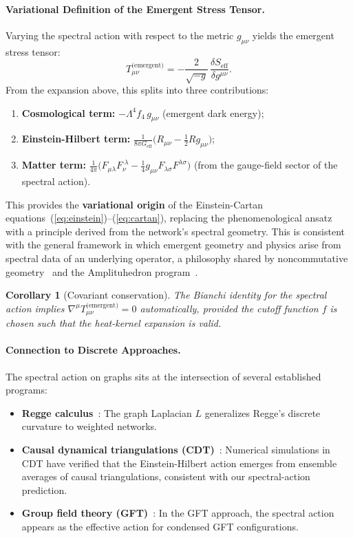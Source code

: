 \documentclass[11pt,a4paper]{article}
\newtheorem{corollary}[theorem]{Corollary}
\theoremstyle{definition}
\theoremstyle{remark}
\newcommand{\Tem}{T^{\text{(emergent)}}}
\newcommand{\Geff}{G_{\text{eff}}}
\newcommand{\Seff}{S_{\text{eff}}}
\begin{document}
\paragraph{Variational Definition of the Emergent Stress Tensor.} Varying the
spectral action with respect to the metric $g_{\mu\nu}$ yields the emergent
stress tensor:
\begin{equation}
\Tem_{\mu\nu} = -\frac{2}{\sqrt{-g}} \,
\frac{\delta \Seff}{\delta g^{\mu\nu}}.
\end{equation}
From the expansion above, this splits into three contributions:
\begin{enumerate}[noitemsep]
\item \textbf{Cosmological term:} $-\Lambda^{4} f_{4} \, g_{\mu\nu}$ (emergent dark energy);
\item \textbf{Einstein-Hilbert term:}
$\frac{1}{8\pi \Geff}\bigl(R_{\mu\nu} - \frac{1}{2} R g_{\mu\nu}\bigr)$;
\item \textbf{Matter term:}
$\frac{1}{4\pi}\bigl(F_{\mu\lambda} F_{\nu}^{\;\lambda}
- \frac{1}{4} g_{\mu\nu} F_{\lambda\sigma} F^{\lambda\sigma}\bigr)$
(from the gauge-field sector of the spectral action).
\end{enumerate}
This provides the \textbf{variational origin} of the Einstein-Cartan
equations~(\ref{eq:einstein})--(\ref{eq:cartan}), replacing the
phenomenological ansatz with a principle derived from the network's spectral
geometry.  This is consistent with the general framework in which emergent
geometry and physics arise from spectral data of an underlying operator, a
philosophy shared by noncommutative geometry~\cite{Connes1994,ChamseddineConnes1996}
and the Amplituhedron program~\cite{ArkaniHamed2014,ArkaniHamed2023,ArkaniHamed2024Cosmohedra}.

\begin{corollary}[Covariant conservation]\label{cor:conservation}
The Bianchi identity for the spectral action implies
$\nabla^{\mu} \Tem_{\mu\nu} = 0$ automatically, provided the cutoff function
$f$ is chosen such that the heat-kernel expansion is valid.
\end{corollary}

\paragraph{Connection to Discrete Approaches.} The spectral action on graphs
sits at the intersection of several established programs:
\begin{itemize}[noitemsep]
\item \textbf{Regge calculus}~\cite{Regge1961}: The graph Laplacian $L$
generalizes Regge's discrete curvature to weighted networks.
\item \textbf{Causal dynamical triangulations (CDT)}~\cite{Ambjorn2020}:
Numerical simulations in CDT have verified that the Einstein-Hilbert action
emerges from ensemble averages of causal triangulations, consistent with our
spectral-action prediction.
\item \textbf{Group field theory (GFT)}~\cite{Oriti2014}: In the GFT approach,
the spectral action appears as the effective action for condensed GFT
configurations.
\end{itemize}
\end{document}
